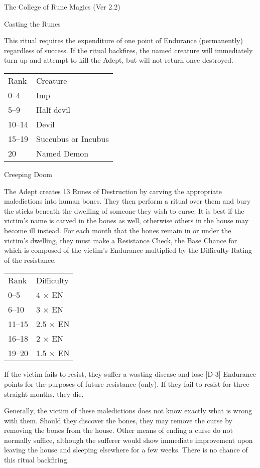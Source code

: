 \begin{Chapter}{The College of Rune Magics (Ver 2.2)}
\begin{ritual}[R-3]{Casting the Runes}
\begin{effects}
This ritual requires the expenditure of one point of Endurance
(permanently) regardless of success.  If the ritual backfires, the
named creature will immediately turn up and attempt to kill the Adept,
but will not return once destroyed.

\begin{tabularx}{\columnwidth}{lX}
Rank	& Creature \\
0--4	& Imp \\
5--9	& Half devil \\
10--14	& Devil \\
15--19	& Succubus or Incubus \\
20	& Named Demon \\
\end{tabularx}
\end{effects}
\end{ritual}

\begin{ritual}[R-4]{Creeping Doom}

\begin{effects}
The Adept creates 13 Runes of Destruction by carving the appropriate
maledictions into human bones.  They then perform a ritual over them
and bury the sticks beneath the dwelling of someone they wish to
curse. It is best if the victim’s name is carved in the bones as well,
otherwise others in the house may become ill instead. For each month
that the bones remain in or under the victim’s dwelling, they must
make a Resistance Check, the Base Chance for which is composed of the
victim’s Endurance multiplied by the Difficulty Rating of the
resistance.

\begin{tabularx}{\columnwidth}{lX}
Rank	& Difficulty \\
0--5	& 4 × EN \\
6--10	& 3 × EN \\
11--15	& 2.5 × EN \\
16--18	& 2 × EN \\
19--20	& 1.5 × EN \\
\end{tabularx}

If the victim fails to resist, they suffer a wasting disease and lose
[D-3] Endurance points for the purposes of future resistance (only).
If they fail to resist for three straight months, they die.

Generally, the victim of these maledictions does not know exactly what
is wrong with them. Should they discover the bones, they may remove
the curse by removing the bones from the house.  Other means of ending
a curse do not normally suffice, although the sufferer would show
immediate improvement upon leaving the house and sleeping elsewhere
for a few weeks.  There is no chance of this ritual backfiring.
\end{effects}
\end{ritual}


\end{Chapter}
